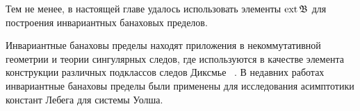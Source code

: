 Тем не менее, в настоящей главе удалось использовать элементы $\operatorname{ext}\mathfrak{B}$ для построения инвариантных банаховых пределов.


Инвариантные банаховы пределы находят приложения в некоммутативной геометрии
и теории сингулярных следов, где используются в качестве элемента конструкции
различных подклассов следов Диксмье
~\cite{carey2003spectral,lord2012singular,sukochev2015characterization,sukochev2016dixmier}.
В недавних работах~\cite{astashkin2015constants_rus_DAN,astashkin2016constants_rus_SMJ} инвариантные банаховы пределы были применены для исследования
асимптотики констант Лебега для системы Уолша.

